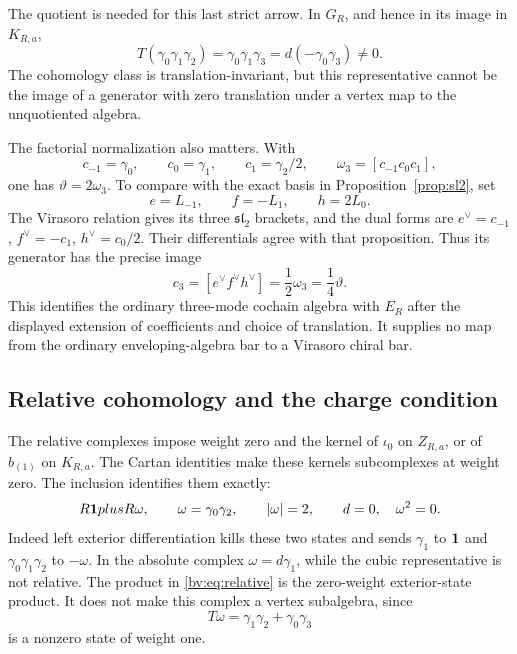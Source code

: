 The quotient is needed for this last strict arrow.  In \(G_R\), and
hence in its image in \(K_{R,a}\),
\begin{equation}\label{bv:eq:translation-defect}
 T(\gamma_0\gamma_1\gamma_2)
 =\gamma_0\gamma_1\gamma_3
 =d(-\gamma_0\gamma_3)\ne0.
\end{equation}
The cohomology class is translation-invariant, but this representative
cannot be the image of a generator with zero translation under a
vertex map to the unquotiented algebra.

The factorial normalization also matters.  With
\[
 c_{-1}=\gamma_0,\qquad c_0=\gamma_1,\qquad c_1=\gamma_2/2,
 \qquad \omega_3=[c_{-1}c_0c_1],
\]
one has \(\vartheta=2\omega_3\).  To compare with the exact basis in
Proposition~\ref{prop:sl2}, set
\[
 e=L_{-1},\qquad f=-L_1,\qquad h=2L_0.
\]
The Virasoro relation gives its three \(\mathfrak{sl}_2\) brackets,
and the dual forms are
\(e^\vee=c_{-1}\), \(f^\vee=-c_1\), \(h^\vee=c_0/2\).
Their differentials agree with that proposition.  Thus its generator
has the precise image
\begin{equation}\label{bv:eq:normalization}
 c_3=[e^\vee f^\vee h^\vee]
 =\frac12\omega_3=\frac14\vartheta.
\end{equation}
This identifies the ordinary three-mode cochain algebra with
\(E_R\) after the displayed extension of coefficients and choice of
translation.  It supplies no map from the ordinary enveloping-algebra
bar to a Virasoro chiral bar.

\subsection{Relative cohomology and the charge condition}

The relative complexes impose weight zero and the kernel of
\(\iota_0\) on \(Z_{R,a}\), or of \(b_{(1)}\) on \(K_{R,a}\).
The Cartan identities make these kernels subcomplexes at weight zero.
The inclusion identifies them exactly:
\begin{equation}\label{bv:eq:relative}
 R\mathbf{1}plus R\omega,\qquad
 \omega=\gamma_0\gamma_2,\qquad |\omega|=2,\qquad
 d=0,\quad \omega^2=0.
\end{equation}
Indeed left exterior differentiation kills these two states and sends
\(\gamma_1\) to \(\mathbf{1}\) and
\(\gamma_0\gamma_1\gamma_2\) to \(-\omega\).  In the absolute
complex \(\omega=d\gamma_1\), while the cubic representative is
not relative.  The product in \eqref{bv:eq:relative} is the
zero-weight exterior-state product.  It does not make this complex a
vertex subalgebra, since
\[
 T\omega=\gamma_1\gamma_2+\gamma_0\gamma_3
\]
is a nonzero state of weight one.

